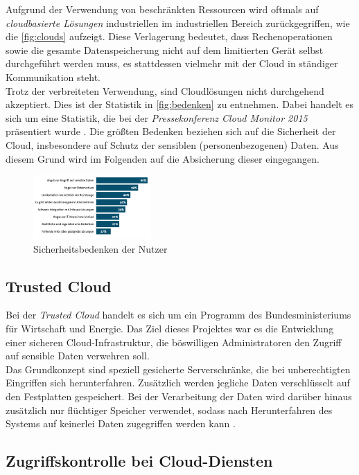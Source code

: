 \documentclass[conference]{IEEEtran}
\begin{document}
Aufgrund der Verwendung von beschränkten Ressourcen wird oftmals auf \textit{cloudbasierte Lösungen} industriellen im industriellen Bereich zurückgegriffen, wie die \autoref{fig:clouds} aufzeigt. Diese Verlagerung bedeutet, dass Rechenoperationen sowie die gesamte Datenspeicherung nicht auf dem limitierten Gerät selbst durchgeführt werden muss, es stattdessen vielmehr mit der Cloud in ständiger Kommunikation steht.\\
Trotz der verbreiteten Verwendung, sind Cloudlösungen nicht durchgehend akzeptiert. Dies ist der Statistik in \autoref{fig:bedenken} zu entnehmen. Dabei handelt es sich um eine Statistik, die bei der \textit{Pressekonferenz Cloud Monitor 2015} präsentiert wurde \cite{bitkom}. Die größten Bedenken beziehen sich auf die Sicherheit der Cloud, insbesondere auf Schutz der sensiblen (personenbezogenen) Daten. Aus diesem Grund wird im Folgenden auf die Absicherung dieser eingegangen.
\begin{figure}[h]
\centering
  \includegraphics[width=0.4\textwidth]{bedenken}
  \caption{Sicherheitsbedenken der Nutzer}
  \label{fig:bedenken}
\end{figure}

\subsection{Trusted Cloud}

Bei der \textit{Trusted Cloud} handelt es sich um ein Programm des Bundesministeriums für Wirtschaft und Energie. Das Ziel dieses Projektes war es die Entwicklung einer sicheren Cloud-Infrastruktur, die böswilligen Administratoren den Zugriff auf sensible Daten verwehren soll. \cite{windriver}\\
Das Grundkonzept sind speziell gesicherte Serverschränke, die bei unberechtigten Eingriffen sich herunterfahren. Zusätzlich werden jegliche Daten verschlüsselt auf den Festplatten gespeichert. Bei der Verarbeitung der Daten wird darüber hinaus zusätzlich nur flüchtiger Speicher verwendet, sodass nach Herunterfahren des Systems auf keinerlei Daten zugegriffen werden kann \cite{eckert2015}.

\subsection{Zugriffskontrolle bei Cloud-Diensten}
\end{document}

